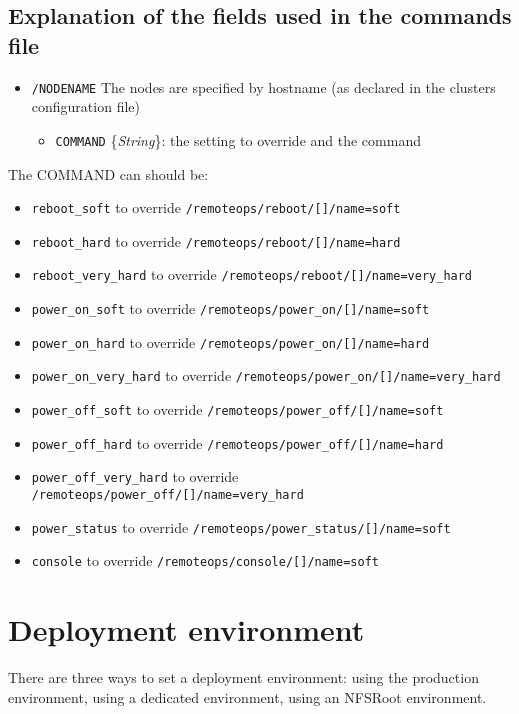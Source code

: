 \documentclass[a4wide,10pt,oneside]{book}
\newcommand{\ypath}[1]{\texttt{#1}}
\newcommand{\yfield}[2]{\texttt{#1} {\small\{{\emph{#2}}\}}:}
\begin{document}
\subsection{Explanation of the fields used in the commands file\\}
\begin{itemize}
  \item \ypath{/NODENAME} The nodes are specified by hostname (as declared in the clusters configuration file)
  \begin{itemize}
    \item \yfield{COMMAND}{String} the setting to override and the command
  \end{itemize}
\end{itemize}

The COMMAND can should be:
\begin{itemize}
  \item \texttt{reboot\_soft} to override \ypath{/remoteops/reboot/[]/name=soft}
  \item \texttt{reboot\_hard} to override \ypath{/remoteops/reboot/[]/name=hard}
  \item \texttt{reboot\_very\_hard} to override \ypath{/remoteops/reboot/[]/name=very\_hard}
  \item \texttt{power\_on\_soft} to override \ypath{/remoteops/power\_on/[]/name=soft}
  \item \texttt{power\_on\_hard} to override \ypath{/remoteops/power\_on/[]/name=hard}
  \item \texttt{power\_on\_very\_hard} to override \ypath{/remoteops/power\_on/[]/name=very\_hard}
  \item \texttt{power\_off\_soft} to override \ypath{/remoteops/power\_off/[]/name=soft}
  \item \texttt{power\_off\_hard} to override \ypath{/remoteops/power\_off/[]/name=hard}
  \item \texttt{power\_off\_very\_hard} to override \ypath{/remoteops/power\_off/[]/name=very\_hard}
  \item \texttt{power\_status} to override \ypath{/remoteops/power\_status/[]/name=soft}
  \item \texttt{console} to override \ypath{/remoteops/console/[]/name=soft}
\end{itemize}


\section{Deployment environment}\label{sec:deployenv}
There are three ways to set a deployment environment: using the production environment, using a dedicated environment, using an NFSRoot environment.
\end{document}
